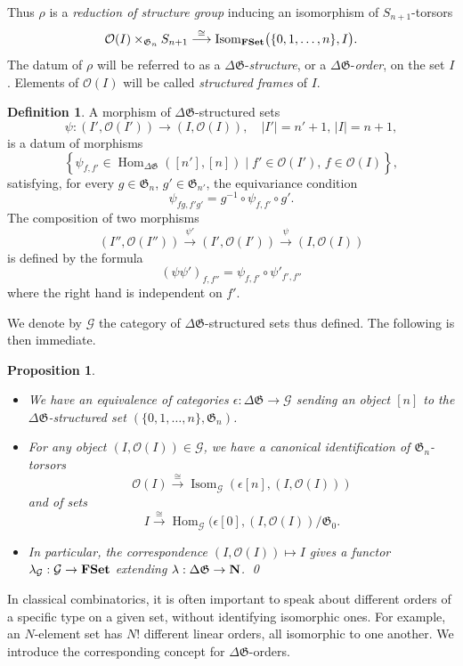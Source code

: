 \documentclass[english,11pt,leqno]{article}
\def\Gen{\mathfrak{G}}
\def\Gc{\mathcal{G}}
\def\Oc{\mathcal{O}}
\def\Hom{\operatorname{Hom}}
\def\on{\operatorname}
\def\lra{\longrightarrow}
\def\Hom{\operatorname{Hom}}
\def\O{{\mathcal O}}
\def\Isom{\on{Isom}}
\def\DG{ {\Delta \Gen}}
\def\FSet{{\bf FSet}}
\newtheorem{prop}[thm]{Proposition}
\theoremstyle{definition}
\newtheorem{defi}[thm]{Definition}
\theoremstyle{remark}
\numberwithin{equation}{section}
\begin{document}
Thus $\rho$ is a {\em reduction of structure group} inducing an isomorphism of $S_{n+1}$-torsors
\[
	\O(I)\times_{\Gen_n} S_{n+1} \overset{\cong}{\lra} \Isom_{\FSet}\bigl( \{0,1,\dots, n\}, I\bigr).
\]
The datum of $\rho$ will be referred to as a $\DG$-{\em structure}, or a $\DG$-{\em order}, on the set $I$.
Elements of $\Oc(I)$ will be called {\em structured frames} of $I$. 
 
\begin{defi}\label{defi:dgstructure}
A morphism of $\DG$-structured sets 
\[
\psi: (I', \Oc(I'))\lra (I, \Oc(I)), \quad |I'|=n'+1, \, |I|=n+1, 
\]
is a datum of morphisms
\[
	\left\{ \psi_{f,f'}\in\Hom_\DG([n'], [n]) \; \big| \; \text{$f'\in \Oc(I')$,
	$f\in\Oc(I)$}\right\},
\]
satisfying, for every $g \in \Gen_{n}$, $g' \in \Gen_{n'}$, the equivariance condition
\[
	\psi_{fg, f'g'} = g^{-1} \circ \psi_{f, f'}\circ g'.
\]
The composition of two morphisms
\[
	(I'', \Oc(I'')) \overset{\psi'}{\lra}  (I', \Oc(I')) \overset{\psi}{\lra} (I, \Oc(I))
\]
is defined by the formula
\[
(\psi\psi')_{f, f''} = \psi_{f,f'} \circ \psi'_{f', f''}
\]
where the right hand is independent on $f'$. 
\end{defi}
 
We denote by $\Gc$ the category of $\DG$-structured sets thus defined.  The following is then
immediate.
 
\begin{prop}
\begin{itemize}
\item[(a)] We have an equivalence of categories $\epsilon:\DG\to\Gc$ sending an object $[n]$
to the $\DG$-structured set $(\{0,1,\dots, n\}, \Gen_n)$.

\item[(b)] For any object $(I, \Oc(I))\in\Gc$, we have a canonical identification of $\Gen_n$-torsors
\[
	\Oc(I) \overset{\cong}{\lra} \Isom_\Gc(\epsilon [n], (I, \Oc(I)))
\]
and of sets
\[
	I \overset{\cong}{\lra} \Hom_\Gc(\epsilon[0], (I, \Oc(I))/\Gen_0. 
\]
\item[(c)]  In particular, the correspondence $(I, \Oc(I))\mapsto I$ gives a functor
	$ \lambda_{\Gc}:\Gc\to  \FSet$ extending $\lambda:\DG\to\bf N$. \qed
\end{itemize}
\end{prop}

In classical combinatorics, it is often important to speak about different orders of a specific type on
a given set, without identifying isomorphic ones. For example, an $N$-element set has $N!$ different
linear orders, all isomorphic to one another. We introduce the corresponding concept for
$\DG$-orders.
\end{document}
